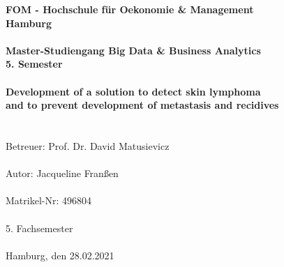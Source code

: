 		\begin{titlepage}
			\begin{center}
			\renewcommand{\baselinestretch}{1.5}
					\textbf{\large FOM - Hochschule für Oekonomie \& Management \\
						Hamburg \\
						\ \\
						Master-Studiengang Big Data \& Business Analytics \\
						5. Semester \\
						\ \\
						Development of a solution to detect skin lymphoma  \\
						and to prevent development of metastasis and recidives} \ \\
						\ \\
						
						
					\textrm{
						\ \\
						Betreuer: Prof. Dr. David Matusievicz \\
						\ \\
						Autor: Jacqueline Franßen \\
						\ \\
						Matrikel-Nr: 496804 \\
						\ \\
						5. Fachsemester \\
						\ \\
						Hamburg, den 28.02.2021 \\
						}
			\end{center}
		\end{titlepage}

%

			\setcounter{tocdepth}{3}
			\setcounter{secnumdepth}{3}		
			\thispagestyle{empty}
			\tableofcontents
			\newpage
			\listoffigures
			\listoftables

			\thispagestyle{empty}